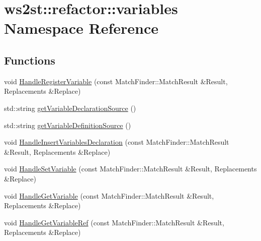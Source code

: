 \hypertarget{namespacews2st_1_1refactor_1_1variables}{}\section{ws2st\+:\+:refactor\+:\+:variables Namespace Reference}
\label{namespacews2st_1_1refactor_1_1variables}
\subsection*{Functions}
\begin{DoxyCompactItemize}
\item 
void \mbox{\hyperlink{namespacews2st_1_1refactor_1_1variables_a3a4d7300be9fe7ab218d635e003cdf17}{Handle\+Register\+Variable}} (const Match\+Finder\+::\+Match\+Result \&Result, Replacements \&Replace)
\item 
std\+::string \mbox{\hyperlink{namespacews2st_1_1refactor_1_1variables_aa668312b7309e9263a184d843ff80dec}{get\+Variable\+Declaration\+Source}} ()
\item 
std\+::string \mbox{\hyperlink{namespacews2st_1_1refactor_1_1variables_a64cf7d9b331531ffc997992313627026}{get\+Variable\+Definition\+Source}} ()
\item 
void \mbox{\hyperlink{namespacews2st_1_1refactor_1_1variables_abd67fe0f6eeb461f57ea652c43890c4a}{Handle\+Insert\+Variables\+Declaration}} (const Match\+Finder\+::\+Match\+Result \&Result, Replacements \&Replace)
\item 
void \mbox{\hyperlink{namespacews2st_1_1refactor_1_1variables_a7896c4e7ab5a8bec3da0c340a60f18f9}{Handle\+Set\+Variable}} (const Match\+Finder\+::\+Match\+Result \&Result, Replacements \&Replace)
\item 
void \mbox{\hyperlink{namespacews2st_1_1refactor_1_1variables_adffc576eece8524a54ea36593310c4fb}{Handle\+Get\+Variable}} (const Match\+Finder\+::\+Match\+Result \&Result, Replacements \&Replace)
\item 
void \mbox{\hyperlink{namespacews2st_1_1refactor_1_1variables_a792197f02667d39f6a345ac2e0a63008}{Handle\+Get\+Variable\+Ref}} (const Match\+Finder\+::\+Match\+Result \&Result, Replacements \&Replace)
\end{DoxyCompactItemize}
